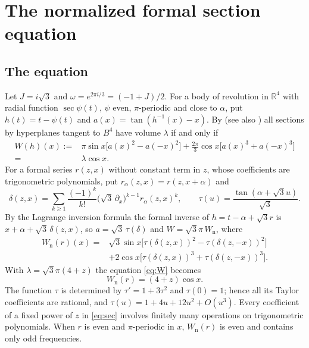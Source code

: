 \documentclass[11pt]{amsart}
\numberwithin{equation}{section}
\theoremstyle{definition}
\theoremstyle{remark}
\newcommand{\R}{\mathbb{R}}
\newcommand{\Wn}{W_{\mathrm n}}
\begin{document}
\section{The normalized formal section equation}\label{sec:formal}

\subsection{The equation}
Let $J=i\sqrt3$ and $\omega=e^{2\pi i/3}=(-1+J)/2$. For a body of revolution in $\R^4$ with radial function $\sec\psi(t)$, $\psi$ even, $\pi$-periodic and close to $\alpha$, put $h(t)=t-\psi(t)$ and $a(x)=\tan(h^{-1}(x)-x)$. By \cite[equation (6) and Section 2]{Had} (see also \cite[Proposition 3.1]{KS}) all sections by hyperplanes tangent to $B^4$ have volume $\lambda$ if and only if
\begin{equation}\label{eq:W}
\begin{aligned}
W(h)(x):={}&\pi\sin x\bigl[a(x)^2-a(-x)^2\bigr]+\tfrac{2\pi}3\cos x\bigl[a(x)^3+a(-x)^3\bigr]\\
={}&\lambda\cos x .
\end{aligned}
\end{equation}
For a formal series $r(z,x)$ without constant term in $z$, whose coefficients are trigonometric polynomials, put $r_\alpha(z,x)=r(z,x+\alpha)$ and
\[
\delta(z,x)=\sum_{k\ge1}\frac{(-1)^k}{k!}\bigl(\sqrt3\,\partial_x\bigr)^{k-1}r_\alpha(z,x)^k,\qquad \tau(u)=\frac{\tan(\alpha+\sqrt3u)}{\sqrt3}.
\]
By the Lagrange inversion formula the formal inverse of $h=t-\alpha+\sqrt3r$ is $x+\alpha+\sqrt3\,\delta(z,x)$, so $a=\sqrt3\,\tau(\delta)$ and $W=\sqrt3\pi\,\Wn$, where
\begin{equation}\label{eq:sec}
\begin{aligned}
\Wn(r)(x)={}&\sqrt3\sin x\bigl[\tau(\delta(z,x))^2-\tau(\delta(z,-x))^2\bigr]\\
&+2\cos x\bigl[\tau(\delta(z,x))^3+\tau(\delta(z,-x))^3\bigr].
\end{aligned}
\end{equation}
With $\lambda=\sqrt3\pi(4+z)$ the equation \eqref{eq:W} becomes
\begin{equation}\label{eq:secnorm}
\Wn(r)=(4+z)\cos x .
\end{equation}
The function $\tau$ is determined by $\tau'=1+3\tau^2$ and $\tau(0)=1$; hence all its Taylor coefficients are rational, and $\tau(u)=1+4u+12u^2+O(u^3)$. Every coefficient of a fixed power of $z$ in \eqref{eq:sec} involves finitely many operations on trigonometric polynomials. When $r$ is even and $\pi$-periodic in $x$, $\Wn(r)$ is even and contains only odd frequencies.
\end{document}

